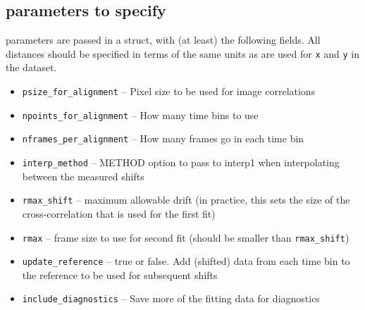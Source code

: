 \documentclass{article}
\begin{document}
\subsection{parameters to specify}
parameters are passed in a struct, with (at least) the following fields. All
distances should be specified in terms of the same units as are used for
\verb|x| and \verb|y| in the dataset.

\begin{itemize}
\item \verb|psize_for_alignment| -- Pixel size to be used for image correlations
\item \verb|npoints_for_alignment| -- How many time bins to use
\item \verb|nframes_per_alignment| -- How many frames go in each time bin
\item \verb|interp_method| -- METHOD option to pass to interp1 when interpolating between
    the measured shifts
\item \verb|rmax_shift| -- maximum allowable drift (in practice, this sets the
    size of the cross-correlation that is used for the first fit)
\item \verb|rmax| -- frame size to use for second fit (should be smaller than
    \verb|rmax_shift|)
\item \verb|update_reference| -- true or false. Add (shifted) data from each
    time bin to the reference to be used for subsequent shifts
\item \verb|include_diagnostics| -- Save more of the fitting data for diagnostics
\end{itemize}
\end{document}
